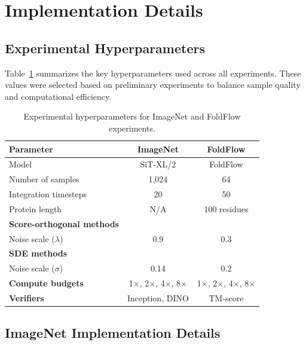 \documentclass{article} %
\begin{document}



\appendix

\section{Implementation Details}
\label{app:implementation-details}

\subsection{Experimental Hyperparameters}
\label{app:experimental-hyperparameters}

Table~\ref{tab:hyperparameters} summarizes the key hyperparameters used across all experiments. These values were selected based on preliminary experiments to balance sample quality and computational efficiency.

\begin{table}[H]
\centering
\begin{tabular}{@{}lcc@{}}
\toprule
\textbf{Parameter} & \textbf{ImageNet} & \textbf{FoldFlow} \\
\midrule
Model & SiT-XL/2 & FoldFlow \\
Number of samples & 1,024 & 64 \\
Integration timesteps & 20 & 50 \\
Protein length & N/A & 100 residues \\
\midrule
\textbf{Score-orthogonal methods} & & \\
Noise scale ($\lambda$) & 0.9 & 0.3 \\
\midrule
\textbf{SDE methods} & & \\
Noise scale ($\sigma$) & 0.14 & 0.2 \\
\midrule
\textbf{Compute budgets} & 1×, 2×, 4×, 8× & 1×, 2×, 4×, 8× \\
\textbf{Verifiers} & Inception, DINO & TM-score \\
\bottomrule
\end{tabular}
\caption{Experimental hyperparameters for ImageNet and FoldFlow experiments.}
\label{tab:hyperparameters}
\end{table}

\subsection{ImageNet Implementation Details}
\label{app:imagenet-details}
\end{document}
